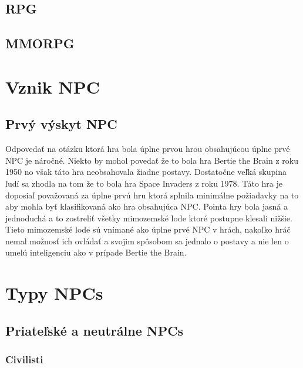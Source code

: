 \documentclass[10pt,twoside,slovak,a4paper]{article}
\begin{document}
\subsection{RPG} \label{RPG}
\subsection{MMORPG} \label{MMORPG}



\section{Vznik NPC}    \label{Vznik}
\subsection{Prvý výskyt NPC} \label{NPC 1 time}
Odpovedať na otázku ktorá hra bola úplne prvou hrou obsahujúcou úplne prvé NPC je náročné. Niekto by mohol povedať že to bola hra Bertie the Brain z roku 1950 no však táto hra neobsahovala žiadne postavy. Dostatočne veľká skupina ľudí sa zhodla na tom že to bola hra Space Invaders z roku 1978. Táto hra je doposiaľ považovaná za úplne prvú hru ktorá splnila minimálne požiadavky na to aby mohla byť klasifikovaná ako hra obsahujúca NPC. Pointa hry bola jasná a jednoduchá a to zostreliť všetky mimozemské lode ktoré postupne klesali nižšie. Tieto mimozemské lode sú vnímané ako úplne prvé NPC v hrách, nakoľko hráč nemal možnosť ich ovládať a svojim spôsobom sa jednalo o postavy a nie len o umelú inteligenciu ako v prípade Bertie the Brain.  



\section{Typy NPCs}     \label{Typy}

\subsection{Priateľské a neutrálne NPCs} \label{ally}

\subsubsection{Civilisti} \label{Civilisti}
\end{document}
